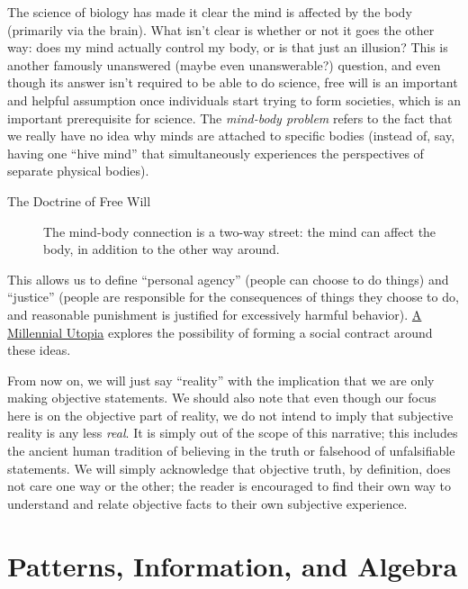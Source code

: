 The science of biology has made it clear the mind is affected by the body (primarily via the brain). What isn't clear is whether or not it goes the other way: does my mind actually control my body, or is that just an illusion? This is another famously unanswered (maybe even unanswerable?) question, and even though its answer isn't required to be able to do science, free will is an important and helpful assumption once individuals start trying to form societies, which is an important prerequisite for science. The \emph{mind-body problem} refers to the fact that we really have no idea why minds are attached to specific bodies (instead of, say, having one ``hive mind'' that simultaneously experiences the perspectives of separate physical bodies).

\begin{description}
  \item[The Doctrine of Free Will] The mind-body connection is a two-way street: the mind can affect the body, in addition to the other way around.
\end{description} 

This allows us to define ``personal agency'' (people can choose to do things) and ``justice'' (people are responsible for the consequences of things they choose to do, and reasonable punishment is justified for excessively harmful behavior). \href{/millennial-utopia}{A Millennial Utopia} explores the possibility of forming a social contract around these ideas.

From now on, we will just say ``reality'' with the implication that we are only making objective statements. We should also note that even though our focus here is on the objective part of reality, we do not intend to imply that subjective reality is any less \emph{real}. It is simply out of the scope of this narrative; this includes the ancient human tradition of believing in the truth or falsehood of unfalsifiable statements. We will simply acknowledge that objective truth, by definition, does not care one way or the other; the reader is encouraged to find their own way to understand and relate objective facts to their own subjective experience.

\section{Patterns, Information, and Algebra}

